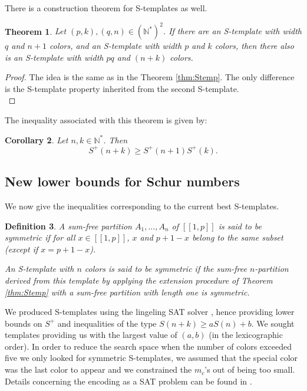 \documentclass{article}
\newtheorem{definition}{Definition}[section]
\newtheorem{theorem}[definition]{Theorem}
\newtheorem{computational theorem}[definition]{Computational Theorem}
\newtheorem{corollary}[definition]{Corollary}
\begin{document}
There is a construction theorem for S-templates as well.

\begin{theorem}
	Let \((p,k), (q,n) \in (\mathbb{N}^*)^2\). If there are an S-template with width \(q\) and \(n+1\) colors,
	and an S-template with width \(p\) and \(k\) colors, then there also is an S-template with width \(pq\) and \((n+k)\) 
	colors.
\end{theorem}

\begin{proof}
The idea is the same as in the Theorem \ref{thm:Stemp}. The only difference is the S-template property inherited 
from the second S-template. \\
\end{proof}
	
The inequality associated with this theorem is given by:
	
\begin{corollary}
	Let \(n, k \in \mathbb{N}^*\). Then
	\[ S^+(n+k) \geqslant S^+(n+1)S^+(k).\]
\end{corollary}


\subsection{New lower bounds for Schur numbers}
\label{subsec:lowS}

We now give the inequalities corresponding to the current  best S-templates.

\begin{definition}
A sum-free partition \(A_1, ..., A_n\) of \([\![1, p]\!]\) is said to be symmetric if for all \( x \in [\![1, p]\!]\), 
\(x\) and \(p + 1 - x\) belong to the same subset (except if \(x = p + 1 - x\)).

An S-template with \(n\) colors is said to be symmetric if the sum-free \(n\)-partition derived 
from this template by applying the extension procedure of Theorem \ref{thm:Stemp} with a sum-free 
partition with length one is symmetric. 
\end{definition}

We produced S-templates using the lingeling SAT solver \cite{Lingeling2017}, hence providing lower bounds on 
\(S^+\) and inequalities of the type \(S(n+k) \geqslant a S(n) + b\). We sought templates providing us with 
the largest value of \((a, b)\) (in the lexicographic order). In order to reduce the search space when the number 
of colors exceeded five we only looked for symmetric S-templates, we assumed that the special color was the last 
color to appear and we constrained the \(m_c\)'s out of being too small. Details concerning the encoding as a SAT 
problem can be found in \cite{Heule2017}.
\end{document}
